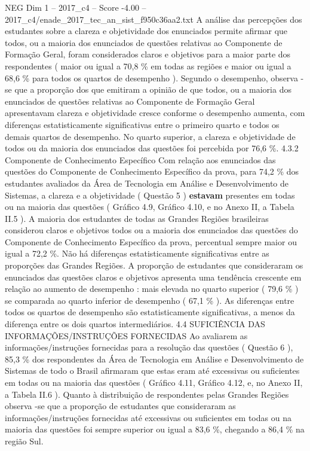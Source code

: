 \begin{textsample}{NEG Dim 1 – 2017\_c4 – Score -4.00 – 2017\_c4/enade\_2017\_tec\_an\_sist\_f950c36aa2.txt}
A análise das percepções dos estudantes sobre a clareza e objetividade dos enunciados permite afirmar que todos, ou a maioria dos enunciados de questões relativas ao Componente de Formação Geral, foram considerados claros e objetivos para a maior parte dos respondentes ( maior ou igual a 70,8 \% em todas as regiões e maior ou igual a 68,6 \% para todos os quartos de desempenho ).
Segundo o desempenho, observa -se que a proporção dos que emitiram a opinião de que todos, ou a maioria dos enunciados de questões relativas ao Componente de Formação Geral apresentavam clareza e objetividade cresce conforme o desempenho aumenta, com diferenças estatisticamente significativas entre o primeiro quarto e todos os demais quartos de desempenho.
No quarto superior, a clareza e objetividade de todos ou da maioria dos enunciados das questões foi percebida por 76,6 \%. 4.3.2 Componente de Conhecimento Específico Com relação aos enunciados das questões do Componente de Conhecimento Específico da prova, para 74,2 \% dos estudantes avaliados da Área de Tecnologia em Análise e Desenvolvimento de Sistemas, a clareza e a objetividade ( Questão 5 ) \textbf{estavam} presentes em todas ou na maioria das questões ( Gráfico 4.9, Gráfico 4.10, e no Anexo II, a Tabela II.5 ).
A maioria dos estudantes de todas as Grandes Regiões brasileiras considerou claros e objetivos todos ou a maioria dos enunciados das questões do Componente de Conhecimento Específico da prova, percentual sempre maior ou igual a 72,2 \%.
Não há diferenças estatisticamente significativas entre as proporções das Grandes Regiões.
A proporção de estudantes que consideraram os enunciados das questões claros e objetivos apresenta uma tendência crescente em relação ao aumento de desempenho : mais elevada no quarto superior ( 79,6 \% ) se comparada ao quarto inferior de desempenho ( 67,1 \% ).
As diferenças entre todos os quartos de desempenho são estatisticamente significativas, a menos da diferença entre os dois quartos intermediários. 4.4 SUFICIÊNCIA DAS INFORMAÇÕES/INSTRUÇÕES FORNECIDAS Ao avaliarem as informações/instruções fornecidas para a resolução das questões ( Questão 6 ), 85,3 \% dos respondentes da Área de Tecnologia em Análise e Desenvolvimento de Sistemas de todo o Brasil afirmaram que estas eram até excessivas ou suficientes em todas ou na maioria das questões ( Gráfico 4.11, Gráfico 4.12, e, no Anexo II, a Tabela II.6 ).
Quanto à distribuição de respondentes pelas Grandes Regiões observa -se que a proporção de estudantes que consideraram as informações/instruções fornecidas até excessivas ou suficientes em todas ou na maioria das questões foi sempre superior ou igual a 83,6 \%, chegando a 86,4 \% na região Sul.

\end{textsample}
